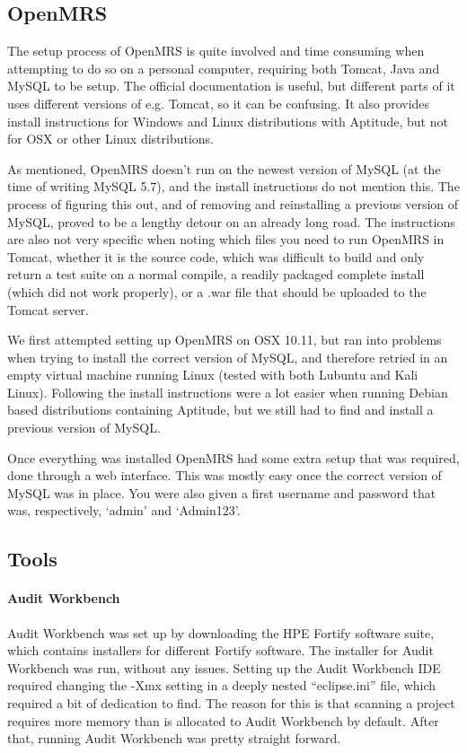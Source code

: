\documentclass{report} %
\begin{document}
\subsection{OpenMRS}
  The setup process of OpenMRS is quite involved and time consuming when
  attempting to do so on a personal computer, requiring both Tomcat, Java and
  MySQL to be setup. The official documentation is useful, but different parts
  of it uses different versions of e.g. Tomcat, so it can be confusing.
  It also provides install instructions for Windows and Linux distributions
  with Aptitude, but not for OSX or other Linux distributions. 

  As mentioned, OpenMRS doesn't run on the newest version of MySQL (at the time
  of writing MySQL 5.7), and the install instructions do not mention this. The
  process of figuring this out, and of removing and reinstalling a previous
  version of MySQL, proved to be a lengthy detour on an already long road.
  The instructions are also not very specific when noting which files you need
  to run OpenMRS in Tomcat, whether it is the source code, which was difficult
  to build and only return a test suite on a normal compile, a readily packaged
  complete install (which did not work properly), or a .war file that should be
  uploaded to the Tomcat server.

  We first attempted setting up OpenMRS on OSX 10.11, but ran into problems when
  trying to install the correct version of MySQL, and therefore retried in an
  empty virtual machine running Linux (tested with both Lubuntu and Kali Linux).
  Following the install instructions were a lot easier when running Debian based
  distributions containing Aptitude, but we still had to find and install a
  previous version of MySQL. 

  Once everything was installed OpenMRS had some extra setup that was required,
  done through a web interface. This was mostly easy once the correct version of
  MySQL was in place. You were also given a first username and password that
  was, respectively, `admin' and `Admin123'.


\subsection{Tools}
\paragraph{Audit Workbench}

Audit Workbench was set up by downloading the HPE Fortify software suite, which
contains installers for different Fortify software. The installer for Audit
Workbench was run, without any issues. Setting up the Audit Workbench IDE
required changing the -Xmx setting in a deeply nested ``eclipse.ini'' file,
which required a bit of dedication to find. The reason for this is that scanning
a project requires more memory than is allocated to Audit Workbench by default.
After that, running Audit Workbench was pretty straight forward.
\end{document}
